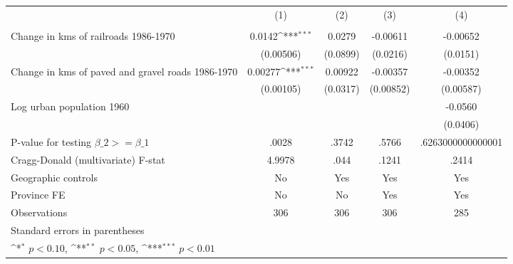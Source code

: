 {
\def\sym#1{\ifmmode^{#1}\else\(^{#1}\)\fi}
\begin{tabular}{l*{4}{c}}
\hline\hline
                &\multicolumn{1}{c}{(1)}&\multicolumn{1}{c}{(2)}&\multicolumn{1}{c}{(3)}&\multicolumn{1}{c}{(4)}\\
                &\multicolumn{1}{c}{}&\multicolumn{1}{c}{}&\multicolumn{1}{c}{}&\multicolumn{1}{c}{}\\
\hline
Change in kms of railroads 1986-1970&   0.0142\sym{***}&   0.0279         & -0.00611         & -0.00652         \\
                &(0.00506)         & (0.0899)         & (0.0216)         & (0.0151)         \\
[1em]
Change in kms of paved and gravel roads 1986-1970&  0.00277\sym{***}&  0.00922         & -0.00357         & -0.00352         \\
                &(0.00105)         & (0.0317)         &(0.00852)         &(0.00587)         \\
[1em]
Log urban population 1960&                  &                  &                  &  -0.0560         \\
                &                  &                  &                  & (0.0406)         \\
\hline
P-value for testing $\beta\_{2} >= \beta\_{1}$&    .0028         &    .3742         &    .5766         &.6263000000000001         \\
Cragg-Donald (multivariate) F-stat&   4.9978         &     .044         &    .1241         &    .2414         \\
Geographic controls&       No         &      Yes         &      Yes         &      Yes         \\
Province FE     &       No         &       No         &      Yes         &      Yes         \\
Observations    &      306         &      306         &      306         &      285         \\
\hline\hline
\multicolumn{5}{l}{\footnotesize Standard errors in parentheses}\\
\multicolumn{5}{l}{\footnotesize \sym{*} \(p<0.10\), \sym{**} \(p<0.05\), \sym{***} \(p<0.01\)}\\
\end{tabular}
}
